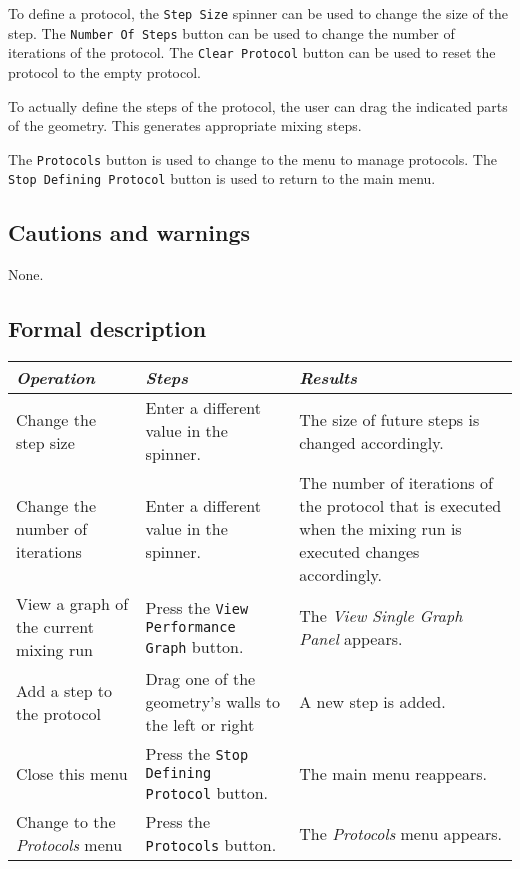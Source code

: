   To define a protocol, the \texttt{Step Size} spinner can be used to change the size of the step. The \texttt{Number Of Steps} button can be used to change the number of iterations of the protocol. The \texttt{Clear Protocol} button can be used to reset the protocol to the empty protocol.
  
  To actually define the steps of the protocol, the user can drag the indicated parts of the geometry. This generates appropriate mixing steps.
  
  The \texttt{Protocols} button is used to change to the menu to manage protocols. The \texttt{Stop Defining Protocol} button is used to return to the main menu.

  \subsection*{Cautions and warnings}
  None.

  \subsection*{Formal description}
  \begin{tabularx}{\textwidth}{XXX}
    \toprule
    \emph{Operation} & \emph{Steps} & \emph{Results} \\
    \midrule
    Change the step size & Enter a different value in the spinner. & The size of future steps is changed accordingly. \\
    \midrule
    Change the number of iterations & Enter a different value in the spinner. & The number of iterations of the protocol that is executed when the mixing run is executed changes accordingly. \\
    \midrule
    View a graph of the current mixing run & Press the \texttt{View Performance Graph} button. & The \emph{View Single Graph Panel} appears. \\
    \midrule
    Add a step to the protocol & Drag one of the geometry's walls to the left or right & A new step is added. \\
    \midrule
    Close this menu & Press the \texttt{Stop Defining Protocol} button. & The main menu reappears. \\
    \midrule
    Change to the \emph{Protocols} menu & Press the \texttt{Protocols} button. & The \emph{Protocols} menu appears. \\
    \bottomrule
  \end{tabularx}
  
  
